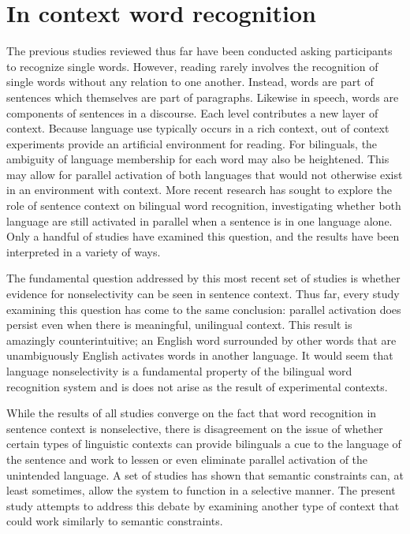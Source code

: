\section{In context word recognition}\label{Intro::InContext}
The previous studies reviewed thus far have been conducted asking participants to recognize single words. However, reading rarely involves the recognition of single words without any relation to one another. Instead, words are part of sentences which themselves are part of paragraphs. Likewise in speech, words are components of sentences in a discourse. Each level contributes a new layer of context. Because language use typically occurs in a rich context, out of context experiments provide an artificial environment for reading. For bilinguals, the ambiguity of language membership for each word may also be heightened. This may allow for parallel activation of both languages that would not otherwise exist in an environment with context. More recent research has sought to explore the role of sentence context on bilingual word recognition, investigating whether both language are still activated in parallel when a sentence is in one language alone. Only a handful of studies have examined this question, and the results have been interpreted in a variety of ways.

The fundamental question addressed by this most recent set of studies is whether evidence for nonselectivity can be seen in sentence context. Thus far, every study examining this question has come to the same conclusion: parallel activation does persist even when there is meaningful, unilingual context. This result is amazingly counterintuitive; an English word surrounded by other words that are unambiguously English activates words in another language.  It would seem that language nonselectivity is a fundamental property of the bilingual word recognition system and is does not arise as the result of experimental contexts. 

While the results of all studies converge on the fact that word recognition in sentence context is nonselective, there is disagreement on the issue of whether certain types of linguistic contexts can provide bilinguals a cue to the language of the sentence and work to lessen or even eliminate parallel activation of the unintended language. A set of studies has shown that semantic constraints can, at least sometimes, allow the system to function in a selective manner. The present study attempts to address this debate by examining another type of context that could work similarly to semantic constraints. 

